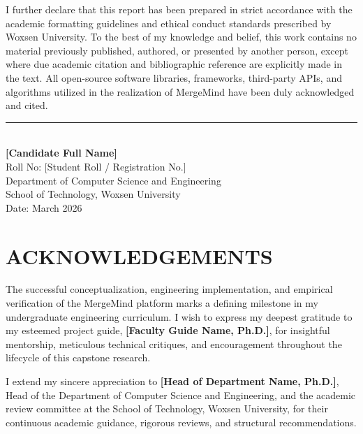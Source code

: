 \documentclass[12pt,a4paper,oneside]{report}
\begin{document}
\vspace{0.6cm}
I further declare that this report has been prepared in strict accordance with the academic formatting guidelines and ethical conduct standards prescribed by Woxsen University. To the best of my knowledge and belief, this work contains no material previously published, authored, or presented by another person, except where due academic citation and bibliographic reference are explicitly made in the text. All open-source software libraries, frameworks, third-party APIs, and algorithms utilized in the realization of MergeMind have been duly acknowledged and cited.

\vspace{2.5cm}

\begin{flushright}
    \rule{6cm}{0.4pt} \\
    \textbf{[Candidate Full Name]} \\
    Roll No: [Student Roll / Registration No.] \\
    Department of Computer Science and Engineering \\
    School of Technology, Woxsen University \\
    Date: March 2026 \\
\end{flushright}

\cleardoublepage

\chapter*{ACKNOWLEDGEMENTS}

The successful conceptualization, engineering implementation, and empirical verification of the MergeMind platform marks a defining milestone in my undergraduate engineering curriculum. I wish to express my deepest gratitude to my esteemed project guide, \textbf{[Faculty Guide Name, Ph.D.]}, for insightful mentorship, meticulous technical critiques, and encouragement throughout the lifecycle of this capstone research.

\vspace{0.4cm}
I extend my sincere appreciation to \textbf{[Head of Department Name, Ph.D.]}, Head of the Department of Computer Science and Engineering, and the academic review committee at the School of Technology, Woxsen University, for their continuous academic guidance, rigorous reviews, and structural recommendations.
\end{document}
